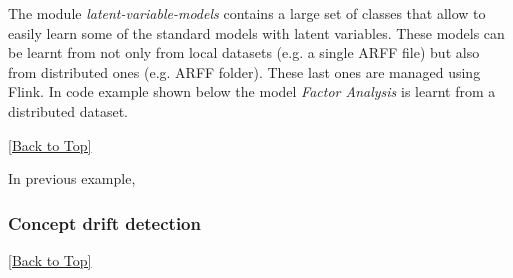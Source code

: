 \documentclass[10pt,a4paper]{article}
\newcommand{\includejavasource}[1]{}
\begin{document}
The module \textit{latent-variable-models} contains a large set of classes that allow to easily learn some of the standard models with latent variables. These models can be learnt from not only from local datasets (e.g. a single ARFF file) but also from distributed ones (e.g. ARFF folder). These last ones are managed using Flink. In code example shown below the model \textit{Factor Analysis} is learnt from a distributed dataset.  

\includejavasource{../../../../examples/src/main/java/eu/amidst/flinklink/examples/extensions/LatentModelsFlink.java}

\hyperref[sec:flinklink]{[Back to Top]}\newline 

In previous example, 


\subsubsection{Concept drift detection}\label{sec:flinklink:ext:conceptdrift}

\includejavasource{../../../../examples/src/main/java/eu/amidst/flinklink/examples/reviewMeeting2015/ConceptDriftDetector.java}


\hyperref[sec:flinklink]{[Back to Top]}\newline 
\end{document}
